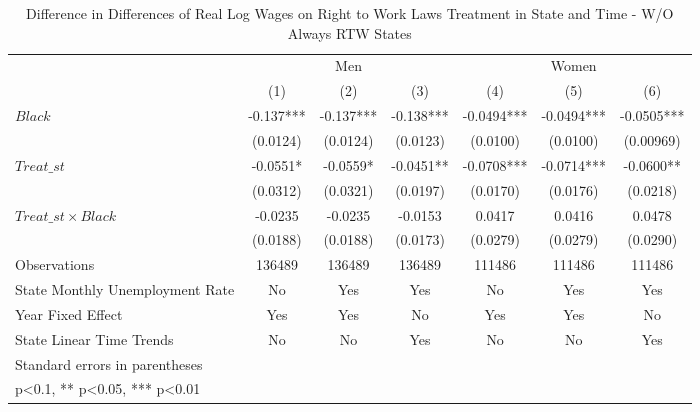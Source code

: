 \begin{table}[htbp]\centering
\def\sym#1{\ifmmode^{#1}\else\(^{#1}\)\fi}
\caption{Difference in Differences of Real Log Wages on Right to Work Laws Treatment in State and Time - W/O Always RTW States}
\begin{tabular}{l*{6}{c}}
\hline\hline
                    &\multicolumn{3}{c}{Men}                        &\multicolumn{3}{c}{Women}                      \\\cmidrule(lr){2-4}\cmidrule(lr){5-7}
                    &\multicolumn{1}{c}{(1)}   &\multicolumn{1}{c}{(2)}   &\multicolumn{1}{c}{(3)}   &\multicolumn{1}{c}{(4)}   &\multicolumn{1}{c}{(5)}   &\multicolumn{1}{c}{(6)}   \\
\hline
$ Black $           &      -0.137***&      -0.137***&      -0.138***&     -0.0494***&     -0.0494***&     -0.0505***\\
                    &    (0.0124)   &    (0.0124)   &    (0.0123)   &    (0.0100)   &    (0.0100)   &   (0.00969)   \\
[1em]
$ Treat\_{st} $      &     -0.0551*  &     -0.0559*  &     -0.0451** &     -0.0708***&     -0.0714***&     -0.0600** \\
                    &    (0.0312)   &    (0.0321)   &    (0.0197)   &    (0.0170)   &    (0.0176)   &    (0.0218)   \\
[1em]
$ Treat\_{st} \times Black $&     -0.0235   &     -0.0235   &     -0.0153   &      0.0417   &      0.0416   &      0.0478   \\
                    &    (0.0188)   &    (0.0188)   &    (0.0173)   &    (0.0279)   &    (0.0279)   &    (0.0290)   \\
\hline
Observations        &      136489   &      136489   &      136489   &      111486   &      111486   &      111486   \\
State Monthly Unemployment Rate&          No   &         Yes   &         Yes   &          No   &         Yes   &         Yes   \\
Year Fixed Effect   &         Yes   &         Yes   &          No   &         Yes   &         Yes   &          No   \\
State Linear Time Trends&          No   &          No   &         Yes   &          No   &          No   &         Yes   \\
\hline\hline
\multicolumn{7}{l}{\footnotesize Standard errors in parentheses}\\
\multicolumn{7}{l}{\footnotesize * p<0.1, ** p<0.05, *** p<0.01}\\
\end{tabular}
\end{table}
